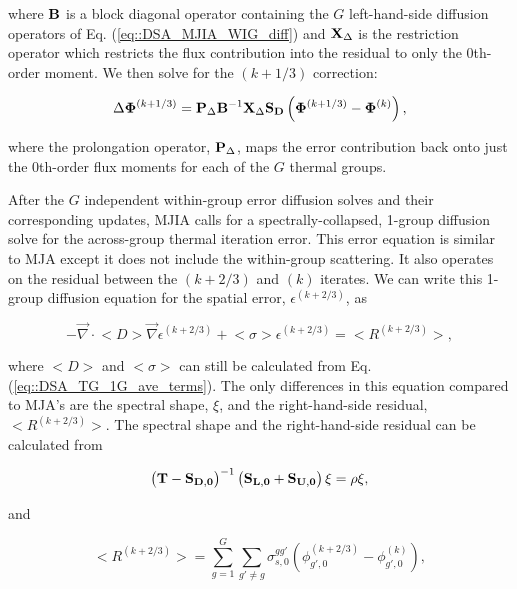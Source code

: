 \noindent where ${\bf B}$ is a block diagonal operator containing the $G$ left-hand-side diffusion operators of Eq. (\ref{eq::DSA_MJIA_WIG_diff}) and ${\bf X}_{\Delta}$ is the restriction operator which restricts the flux contribution into the residual to only the 0th-order moment. We then solve for the $(k+1/3)$ correction:

\begin{equation}
\label{eq::DSA_MJIA_WIG_phiterm}
 \Delta {\bf \Phi}^{(k+1/3)} = {\bf P}_{\Delta} {\bf B}^{-1} {\bf X}_{\Delta} {\bf S_D} \left(  {\bf \Phi}^{(k+1/3)} - {\bf \Phi}^{(k)} \right),
\end{equation}

\noindent where the prolongation operator, ${\bf P}_{\Delta}$, maps the error contribution back onto just the 0th-order flux moments for each of the $G$ thermal groups.

After the $G$ independent within-group error diffusion solves and their corresponding updates, MJIA calls for a spectrally-collapsed, 1-group diffusion solve for the across-group thermal iteration error. This error equation is similar to MJA except it does not include the within-group scattering. It also operates on the residual between the $(k+2/3)$ and $(k)$ iterates. We can write this 1-group diffusion equation for the spatial error, $\epsilon^{(k+2/3)}$, as

\begin{equation}
\label{eq::DSA_MJIA_EC_diff_eq}
-\vec{\nabla} \cdot \big< D \big> \vec{\nabla} \epsilon^{(k+2/3)}  + \big< \sigma \big> \epsilon^{(k+2/3)}  = \big< R^{(k+2/3)} \big> ,
\end{equation}

\noindent where $\big< D \big>$ and $\big< \sigma \big>$ can still be calculated from Eq. (\ref{eq::DSA_TG_1G_ave_terms}). The only differences in this equation compared to MJA's are the spectral shape, $\xi$, and the right-hand-side residual, $\big< R^{(k+2/3)} \big>$. The spectral shape and the right-hand-side residual can be calculated from

\begin{equation}
\label{eq::DSA_MJIA_eigenpprob}
\left(  {\bf T} - {\bf S_{D,0}} \right)^{-1} \left( {\bf S_{L,0}} +  {\bf S_{U,0}} \right)\xi = \rho \xi ,
\end{equation}

\noindent and 

\begin{equation}
\label{eq::DSA_WGS_diff_residual}
\big< R^{(k+2/3)} \big> = \sum_{g=1}^G \sum_{g' \neq g} \sigma_{s,0}^{g g'} \left( \phi_{g',0}^{(k+2/3)} - \phi_{g',0}^{(k)} \right) ,
\end{equation}

